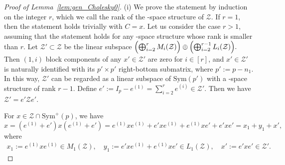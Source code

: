 \documentclass[12pt]{amsart}
\theoremstyle{plain}
\theoremstyle{definition}
\theoremstyle{remark}
\newcommand{\1}{\mathbf{1}}
\begin{document}
\begin{proof}[Proof of Lemma~\ref{lem:gen_Cholesky0}]

(i) We prove the statement by induction on the integer $r$,
 which we call the rank of the \BC-space structure of $\mathcal{Z}$.
If $r=1$, then the statement holds trivially with $C = x$.
Let us consider the case $r>1$,
 assuming that the statement holds for
 any \BC-space structure whose rank is smaller than $r$.
Let $\mathcal{Z}' \subset \mathcal{Z}$ be
 the linear subspace
 $\Bigl( \bigoplus_{i=2}^r M_i(\mathcal{Z}) \Bigr) \oplus 
  \Bigl( \bigoplus_{i=2}^{r-1} L_i(\mathcal{Z}) \Bigr). $
Then $(1, i)$ block components of any $x' \in \mathcal{Z}'$ are zero for $i \in [r]$,
 and $x' \in \mathcal{Z}'$ is naturally identified with its $p' \times p'$ right-bottom submatrix,
 where $p' := p - n_1$.
In this way,
 $\mathcal{Z}'$ can be regarded as a linear subspace of $\mathrm{Sym}(p')$ with a \BC-space structure of rank $r-1$. 
Define 
 $e' := I_p - e^{(1)} = \sum_{i=2}^{r} e^{(i)}\in  \mathcal{Z}'$.
Then we have $\mathcal{Z}' = e' \mathcal{Z} e'$.

For $x \in \mathcal{Z} \cap \mathrm{Sym}^+(p)$,
 we have  
$$ x = (e^{(1)} + e')x(e^{(1)} + e')
 = e^{(1)} x e^{(1)} + e' x e^{(1)} + e^{(1)} x e' + e' x e'
 = x_1 + y_1 + x', $$
 where
 \begin{align*}
 x_1 := e^{(1)} x e^{(1)}  \in M_1(\mathcal{Z}), \quad
 y_1 := e' x e^{(1)} + e^{(1)} x e' \in L_1(\mathcal{Z}), \quad
 x' := e' x e' \in \mathcal{Z}'.
\end{align*}


\end{proof}
\end{document}
